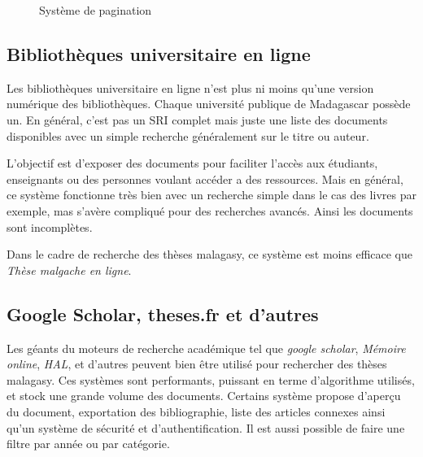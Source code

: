 \begin{figure}[htbp]
	\begin{center}
	\end{center}
	\caption{Système de pagination \citep{these-malgache-en-ligne}}\label{fig:pagination-tme}
\end{figure}

\subsection{Bibliothèques universitaire en ligne}
Les bibliothèques universitaire en ligne n'est plus ni moins qu'une version numérique des bibliothèques. Chaque université publique de Madagascar possède un. En général, c'est pas un SRI complet mais juste une liste des documents disponibles avec un simple recherche généralement sur le titre ou auteur. 

L'objectif est d'exposer des documents pour faciliter l'accès aux étudiants, enseignants ou des personnes voulant accéder a des ressources. Mais en général, ce système fonctionne très bien avec un recherche simple dans le cas des livres par exemple, mas s'avère compliqué pour des recherches avancés. Ainsi les documents sont incomplètes. 

Dans le cadre de recherche des thèses malagasy, ce système est moins efficace que \emph{Thèse malgache en ligne}.

\subsection{Google Scholar, theses.fr et d'autres}
Les géants du moteurs de recherche académique tel que \emph{google scholar}, \emph{Mémoire online}, \emph{HAL}, et d'autres peuvent bien être utilisé pour rechercher des thèses malagasy. Ces systèmes sont performants, puissant en terme d'algorithme utilisés, et stock une grande volume des documents. Certains système propose d’aperçu du document, exportation des bibliographie, liste des articles connexes ainsi qu'un système de sécurité et d'authentification. Il est aussi possible de faire une filtre par année ou par catégorie.

